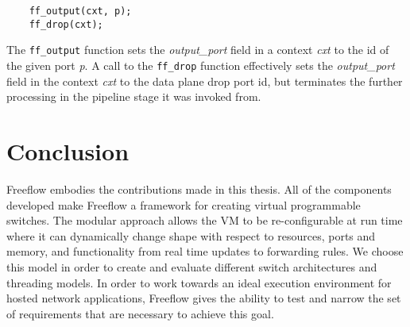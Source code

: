 \begin{lstlisting}
    ff_output(cxt, p);
    ff_drop(cxt);
\end{lstlisting}

The \texttt{ff\_output} function sets the \emph{output\_port} field in a context
\emph{cxt} to the id of the given port \emph{p}. A call to the \texttt{ff\_drop}
function effectively sets the \emph{output\_port} field in the context \emph{cxt}
to the data plane drop port id, but terminates the further processing in the
pipeline stage it was invoked from.

\section{Conclusion}
\label{ff:concl}
Freeflow embodies the contributions made in this thesis. All of the components
developed make Freeflow a framework for creating virtual programmable switches.
The modular approach allows the VM to be re-configurable at run time where it
can dynamically change shape with respect to resources, ports and memory, and
functionality from real time updates to forwarding rules. We choose this model
in order to create and evaluate different switch architectures and threading
models. In order to work towards an ideal execution environment for hosted
network applications, Freeflow gives the ability to test and narrow the set of
requirements that are necessary to achieve this goal.
